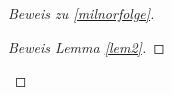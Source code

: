 \documentclass[ngerman,fontsize=11pt, paper=a4, parskip=half, titlepage=true, toc=bib]{scrartcl}
\begin{document}
\begin{proof}[Beweis zu \ref{milnorfolge}]
\begin{proof}[Beweis Lemma \ref{lem2}]


\end{proof}
\end{proof}
\end{document}
